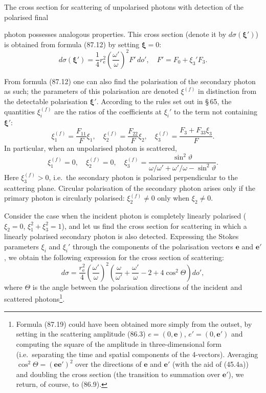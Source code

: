 The cross section for scattering of unpolarised photons with detection of the polarised final


photon possesses analogous properties. This cross section (denote it by $d\sigma(\boldsymbol{\xi}')$) is obtained from formula (87.12) by setting $\boldsymbol{\xi} = 0$:
\begin{equation}
d\sigma(\boldsymbol{\xi}') = \frac{1}{4}r_\mathrm{e}^2\left(\frac{\omega'}{\omega}\right)^{\!2}F'\,do', \quad F' = F_0 + \xi_3' F_3.
\label{eq:87.16}
\end{equation}

From formula (87.12) one can also find the polarisation of the secondary photon as such; the parameters of this polarisation are denoted $\xi^{(f)}$ in distinction from the detectable polarisation $\boldsymbol{\xi}'$. According to the rules set out in \S\,65, the quantities $\xi_i^{(f)}$ are the ratios of the coefficients at $\xi_i'$ to the term not containing $\boldsymbol{\xi}'$:
\begin{equation}
\xi_1^{(f)} = \frac{F_{11}}{F}\xi_1, \quad \xi_2^{(f)} = \frac{F_{22}}{F}\xi_2, \quad \xi_3^{(f)} = \frac{F_3 + F_{33}\xi_3}{F}.
\label{eq:87.17}
\end{equation}
In particular, when an unpolarised photon is scattered,
\begin{equation}
\xi_1^{(f)} = 0, \quad \xi_2^{(f)} = 0, \quad \xi_3^{(f)} = \frac{\sin^2\vartheta}{\omega/\omega' + \omega'/\omega - \sin^2\vartheta}.
\label{eq:87.18}
\end{equation}
Here $\xi_3^{(f)} > 0$, i.e.\ the secondary photon is polarised perpendicular to the scattering plane. Circular polarisation of the secondary photon arises only if the primary photon is circularly polarised: $\xi_2^{(f)} \neq 0$ only when $\xi_2 \neq 0$.

Consider the case when the incident photon is completely linearly polarised ($\xi_2 = 0$, $\xi_1^2 + \xi_3^2 = 1$), and let us find the cross section for scattering in which a linearly polarised secondary photon is also detected. Expressing the Stokes parameters $\xi_i$ and $\xi_i'$ through the components of the polarisation vectors $\mathbf{e}$ and $\mathbf{e}'$, we obtain the following expression for the cross section of scattering:
\begin{equation}
d\sigma = \frac{r_\mathrm{e}^2}{4}\left(\frac{\omega'}{\omega}\right)^{\!2}\left(\frac{\omega}{\omega'} + \frac{\omega'}{\omega} - 2 + 4\cos^2\Theta\right)do',
\label{eq:87.19}
\end{equation}
where $\Theta$ is the angle between the polarisation directions of the incident and scattered photons\footnote{Formula (87.19) could have been obtained more simply from the outset, by setting in the scattering amplitude (86.3) $e = (0, \mathbf{e})$, $e' = (0, \mathbf{e}')$ and computing the square of the amplitude in three-dimensional form (i.e.\ separating the time and spatial components of the 4-vectors). Averaging $\cos^2\Theta = (\mathbf{ee}')^2$ over the directions of $\mathbf{e}$ and $\mathbf{e}'$ (with the aid of (45.4a)) and doubling the cross section (the transition to summation over $\mathbf{e}'$), we return, of course, to (86.9).}.

